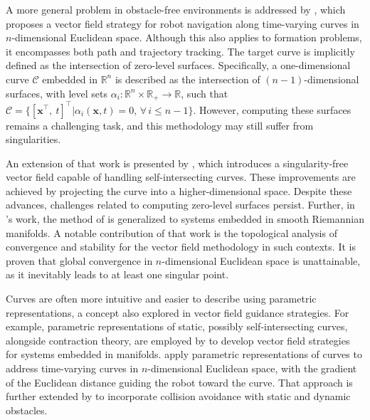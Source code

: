 A more general problem in obstacle-free environments is addressed by \citet{goncalves2010vectorfield}, which proposes a vector field strategy for robot navigation along time-varying curves in $n$-dimensional Euclidean space. Although this also applies to formation problems, it encompasses both path and trajectory tracking. The target curve is implicitly defined as the intersection of zero-level surfaces. Specifically, a one-dimensional curve $\mathcal{C}$ embedded in $\mathbb{R}^n$ is described as the intersection of $(n-1)$-dimensional surfaces, with level sets $\alpha_i:\mathbb{R}^n\times\mathbb{R}_+\to\mathbb{R}$, such that $\mathcal{C} = \{ [ \mathbf{x}^\top,\ t]^\top | \alpha_i(\mathbf{x}, t) = 0,\,\forall\,i\le n-1 \}$. However, computing these surfaces remains a challenging task, and this methodology may still suffer from singularities.

An extension of that work is presented by \citet{yao2021singularity}, which introduces a singularity-free vector field capable of handling self-intersecting curves. These improvements are achieved by projecting the curve into a higher-dimensional space. Despite these advances, challenges related to computing zero-level surfaces persist. Further, in \citet{yao2022topological}'s work, the method of \citet{goncalves2010vectorfield} is generalized to systems embedded in smooth Riemannian manifolds. A notable contribution of that work is the topological analysis of convergence and stability for the vector field methodology in such contexts. It is proven that global convergence in $n$-dimensional Euclidean space is unattainable, as it inevitably leads to at least one singular point.

Curves are often more intuitive and easier to describe using parametric representations, a concept also explored in vector field guidance strategies. For example, parametric representations of static, possibly self-intersecting curves, alongside contraction theory, are employed by \citet{Wu2018} to develop vector field strategies for systems embedded in manifolds. \citet{Rezende2022} apply parametric representations of curves to address time-varying curves in $n$-dimensional Euclidean space, with the gradient of the Euclidean distance guiding the robot toward the curve. That approach is further extended by \citet{Nunes2022} to incorporate collision avoidance with static and dynamic obstacles.

